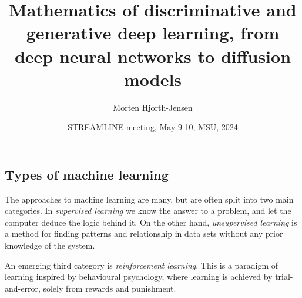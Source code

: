 \documentclass[%
oneside,                 %
final,                   %
10pt]{article}
\begin{document}

\newcommand{\exercisesection}[1]{\subsection*{#1}}






\title{Mathematics of discriminative and generative deep learning, from deep neural networks to diffusion models}


\author{Morten Hjorth-Jensen}

\date{STREAMLINE meeting, May 9-10, MSU, 2024
}

\subsection{Types of machine learning}

\begin{block}{}
The approaches to machine learning are many, but are often split into two main categories. 
In \emph{supervised learning} we know the answer to a problem,
and let the computer deduce the logic behind it. On the other hand, \emph{unsupervised learning}
is a method for finding patterns and relationship in data sets without any prior knowledge of the system.

An emerging  third category is  \emph{reinforcement learning}. This is a paradigm 
of learning inspired by behavioural psychology, where learning is achieved by trial-and-error, 
solely from rewards and punishment.
\end{block}

\end{document}
